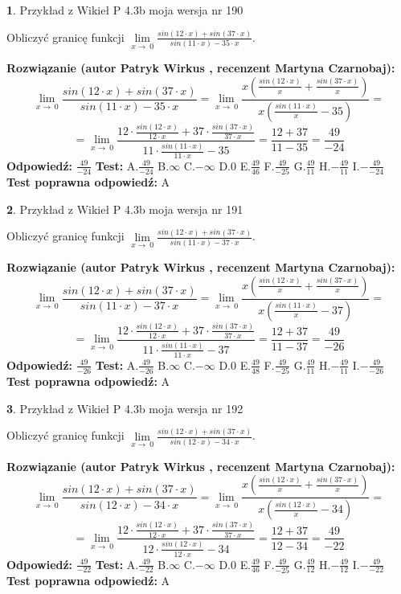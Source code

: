 \documentclass[12pt, a4paper]{article}
\theoremstyle{definition} %
\newtheorem{zad}{}
\newcommand{\zadStart}[1]{\begin{zad}#1\newline}
\newcommand{\zadStop}{\end{zad}}
\newcommand{\rozwStart}[2]{\noindent \textbf{Rozwiązanie (autor #1 , recenzent #2): }\newline}
\newcommand{\rozwStop}{\newline}
\newcommand{\odpStart}{\noindent \textbf{Odpowiedź:}\newline}
\newcommand{\odpStop}{\newline}
\newcommand{\testStart}{\noindent \textbf{Test:}\newline}
\newcommand{\testStop}{\newline}
\newcommand{\kluczStart}{\noindent \textbf{Test poprawna odpowiedź:}\newline}
\newcommand{\kluczStop}{\newline}
\begin{document}
\zadStart{Przykład z Wikieł P 4.3b moja wersja nr 190}


Obliczyć granicę funkcji $\lim\limits_{x\to\ 0}\frac{sin(12 \cdot x)+sin(37 \cdot x)}{sin(11 \cdot x)-35 \cdot x}$.
\zadStop
\rozwStart{Patryk Wirkus}{Martyna Czarnobaj}
$$\lim\limits_{x\to\ 0}\frac{sin(12 \cdot x)+sin(37 \cdot x)}{sin(11 \cdot x)-35 \cdot x}=\lim\limits_{x\to\ 0}\frac{x(\frac{sin(12 \cdot x)}{x}+\frac{sin(37 \cdot x)}{x})}{x(\frac{sin(11 \cdot x)}{x}-35)}=$$
$$=\lim\limits_{x\to\ 0}\frac{12 \cdot \frac{sin(12 \cdot x)}{12 \cdot x}+37 \cdot \frac{sin(37 \cdot x)}{37 \cdot x}}{11 \cdot \frac{sin(11 \cdot x)}{11 \cdot x}-35}=\frac{12+37}{11-35} = \frac{49}{-24}$$
\rozwStop
\odpStart
$\frac{49}{-24}$
\odpStop
\testStart
A.$\frac{49}{-24}$
B.$\infty$
C.$-\infty$
D.$0$
E.$\frac{49}{46}$
F.$\frac{49}{-25}$
G.$\frac{49}{11}$
H.$-\frac{49}{11}$
I.$-\frac{49}{-24}$
\testStop
\kluczStart
A
\kluczStop



\zadStart{Przykład z Wikieł P 4.3b moja wersja nr 191}


Obliczyć granicę funkcji $\lim\limits_{x\to\ 0}\frac{sin(12 \cdot x)+sin(37 \cdot x)}{sin(11 \cdot x)-37 \cdot x}$.
\zadStop
\rozwStart{Patryk Wirkus}{Martyna Czarnobaj}
$$\lim\limits_{x\to\ 0}\frac{sin(12 \cdot x)+sin(37 \cdot x)}{sin(11 \cdot x)-37 \cdot x}=\lim\limits_{x\to\ 0}\frac{x(\frac{sin(12 \cdot x)}{x}+\frac{sin(37 \cdot x)}{x})}{x(\frac{sin(11 \cdot x)}{x}-37)}=$$
$$=\lim\limits_{x\to\ 0}\frac{12 \cdot \frac{sin(12 \cdot x)}{12 \cdot x}+37 \cdot \frac{sin(37 \cdot x)}{37 \cdot x}}{11 \cdot \frac{sin(11 \cdot x)}{11 \cdot x}-37}=\frac{12+37}{11-37} = \frac{49}{-26}$$
\rozwStop
\odpStart
$\frac{49}{-26}$
\odpStop
\testStart
A.$\frac{49}{-26}$
B.$\infty$
C.$-\infty$
D.$0$
E.$\frac{49}{48}$
F.$\frac{49}{-25}$
G.$\frac{49}{11}$
H.$-\frac{49}{11}$
I.$-\frac{49}{-26}$
\testStop
\kluczStart
A
\kluczStop



\zadStart{Przykład z Wikieł P 4.3b moja wersja nr 192}


Obliczyć granicę funkcji $\lim\limits_{x\to\ 0}\frac{sin(12 \cdot x)+sin(37 \cdot x)}{sin(12 \cdot x)-34 \cdot x}$.
\zadStop
\rozwStart{Patryk Wirkus}{Martyna Czarnobaj}
$$\lim\limits_{x\to\ 0}\frac{sin(12 \cdot x)+sin(37 \cdot x)}{sin(12 \cdot x)-34 \cdot x}=\lim\limits_{x\to\ 0}\frac{x(\frac{sin(12 \cdot x)}{x}+\frac{sin(37 \cdot x)}{x})}{x(\frac{sin(12 \cdot x)}{x}-34)}=$$
$$=\lim\limits_{x\to\ 0}\frac{12 \cdot \frac{sin(12 \cdot x)}{12 \cdot x}+37 \cdot \frac{sin(37 \cdot x)}{37 \cdot x}}{12 \cdot \frac{sin(12 \cdot x)}{12 \cdot x}-34}=\frac{12+37}{12-34} = \frac{49}{-22}$$
\rozwStop
\odpStart
$\frac{49}{-22}$
\odpStop
\testStart
A.$\frac{49}{-22}$
B.$\infty$
C.$-\infty$
D.$0$
E.$\frac{49}{46}$
F.$\frac{49}{-25}$
G.$\frac{49}{12}$
H.$-\frac{49}{12}$
I.$-\frac{49}{-22}$
\testStop
\kluczStart
A
\kluczStop
\end{document}
